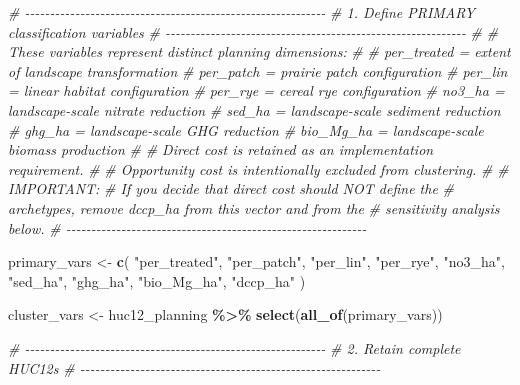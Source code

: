 \documentclass[
]{article}
\newenvironment{Shaded}{\begin{snugshade}}{\end{snugshade}}
\newcommand{\CommentTok}[1]{\textcolor[rgb]{0.56,0.35,0.01}{\textit{#1}}}
\newcommand{\FunctionTok}[1]{\textcolor[rgb]{0.13,0.29,0.53}{\textbf{#1}}}
\newcommand{\NormalTok}[1]{#1}
\newcommand{\OtherTok}[1]{\textcolor[rgb]{0.56,0.35,0.01}{#1}}
\newcommand{\SpecialCharTok}[1]{\textcolor[rgb]{0.81,0.36,0.00}{\textbf{#1}}}
\newcommand{\StringTok}[1]{\textcolor[rgb]{0.31,0.60,0.02}{#1}}
\begin{document}
\begin{Shaded}
\begin{Highlighting}[]
\CommentTok{\# {-}{-}{-}{-}{-}{-}{-}{-}{-}{-}{-}{-}{-}{-}{-}{-}{-}{-}{-}{-}{-}{-}{-}{-}{-}{-}{-}{-}{-}{-}{-}{-}{-}{-}{-}{-}{-}{-}{-}{-}{-}{-}{-}{-}{-}{-}{-}{-}{-}{-}{-}{-}{-}{-}{-}{-}{-}{-}{-}{-}}
\CommentTok{\# 1. Define PRIMARY classification variables}
\CommentTok{\# {-}{-}{-}{-}{-}{-}{-}{-}{-}{-}{-}{-}{-}{-}{-}{-}{-}{-}{-}{-}{-}{-}{-}{-}{-}{-}{-}{-}{-}{-}{-}{-}{-}{-}{-}{-}{-}{-}{-}{-}{-}{-}{-}{-}{-}{-}{-}{-}{-}{-}{-}{-}{-}{-}{-}{-}{-}{-}{-}{-}}
\CommentTok{\#}
\CommentTok{\# These variables represent distinct planning dimensions:}
\CommentTok{\#}
\CommentTok{\#   per\_treated = extent of landscape transformation}
\CommentTok{\#   per\_patch   = prairie patch configuration}
\CommentTok{\#   per\_lin     = linear habitat configuration}
\CommentTok{\#   per\_rye     = cereal rye configuration}
\CommentTok{\#   no3\_ha      = landscape{-}scale nitrate reduction}
\CommentTok{\#   sed\_ha      = landscape{-}scale sediment reduction}
\CommentTok{\#   ghg\_ha      = landscape{-}scale GHG reduction}
\CommentTok{\#   bio\_Mg\_ha   = landscape{-}scale biomass production}
\CommentTok{\#}
\CommentTok{\# Direct cost is retained as an implementation requirement.}
\CommentTok{\#}
\CommentTok{\# Opportunity cost is intentionally excluded from clustering.}
\CommentTok{\#}
\CommentTok{\# IMPORTANT:}
\CommentTok{\# If you decide that direct cost should NOT define the}
\CommentTok{\# archetypes, remove dccp\_ha from this vector and from the}
\CommentTok{\# sensitivity analysis below.}
\CommentTok{\# {-}{-}{-}{-}{-}{-}{-}{-}{-}{-}{-}{-}{-}{-}{-}{-}{-}{-}{-}{-}{-}{-}{-}{-}{-}{-}{-}{-}{-}{-}{-}{-}{-}{-}{-}{-}{-}{-}{-}{-}{-}{-}{-}{-}{-}{-}{-}{-}{-}{-}{-}{-}{-}{-}{-}{-}{-}{-}{-}{-}}

\NormalTok{primary\_vars }\OtherTok{\textless{}{-}} \FunctionTok{c}\NormalTok{(}
  \StringTok{"per\_treated"}\NormalTok{,}
  \StringTok{"per\_patch"}\NormalTok{,}
  \StringTok{"per\_lin"}\NormalTok{,}
  \StringTok{"per\_rye"}\NormalTok{,}
  \StringTok{"no3\_ha"}\NormalTok{,}
  \StringTok{"sed\_ha"}\NormalTok{,}
  \StringTok{"ghg\_ha"}\NormalTok{,}
  \StringTok{"bio\_Mg\_ha"}\NormalTok{,}
  \StringTok{"dccp\_ha"}
\NormalTok{)}

\NormalTok{cluster\_vars }\OtherTok{\textless{}{-}}\NormalTok{ huc12\_planning }\SpecialCharTok{\%\textgreater{}\%}
  \FunctionTok{select}\NormalTok{(}\FunctionTok{all\_of}\NormalTok{(primary\_vars))}

\CommentTok{\# {-}{-}{-}{-}{-}{-}{-}{-}{-}{-}{-}{-}{-}{-}{-}{-}{-}{-}{-}{-}{-}{-}{-}{-}{-}{-}{-}{-}{-}{-}{-}{-}{-}{-}{-}{-}{-}{-}{-}{-}{-}{-}{-}{-}{-}{-}{-}{-}{-}{-}{-}{-}{-}{-}{-}{-}{-}{-}{-}{-}}
\CommentTok{\# 2. Retain complete HUC12s}
\CommentTok{\# {-}{-}{-}{-}{-}{-}{-}{-}{-}{-}{-}{-}{-}{-}{-}{-}{-}{-}{-}{-}{-}{-}{-}{-}{-}{-}{-}{-}{-}{-}{-}{-}{-}{-}{-}{-}{-}{-}{-}{-}{-}{-}{-}{-}{-}{-}{-}{-}{-}{-}{-}{-}{-}{-}{-}{-}{-}{-}{-}{-}}


\end{Highlighting}
\end{Shaded}
\end{document}
